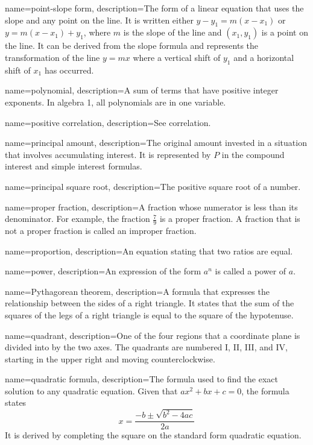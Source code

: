  {
	name=point-slope form,
	description={The form of a linear equation that uses the slope and any point on the line. It is written either $y-y_1 = m(x-x_1)$ or $y=m(x-x_1)+y_1$, where $m$ is the slope of the line and $(x_1,y_1)$ is a point on the line. It can be derived from the slope formula and represents the transformation of the line $y = mx$ where a vertical shift of $y_1$ and a horizontal shift of $x_1$ has occurred.}
}

 {
	name=polynomial,
	description={A sum of terms that have positive integer exponents. In algebra 1, all polynomials are in one variable.}
}

 {
	name=positive correlation,
	description={See \gls{correlation}.}
}

 {
	name=principal amount,
	description={The original amount invested in a situation that involves accumulating interest. It is represented by $P$ in the \gls{compound interest} and simple interest formulas.}
}

 {
	name=principal square root,
	description={The positive square root of a number.}
}

 {
	name=proper fraction,
	description={A fraction whose \gls{numerator} is less than its \gls{denominator}. For example, the fraction $\frac{7}{9}$ is a proper fraction. A fraction that is not a proper fraction is called an \gls{improper fraction}.}
}

 {
	name=proportion,
	description={An equation stating that two ratios are equal.}
}

 {
	name=power,
	description={An expression of the form $a^n$ is called a power of $a$.}
}
 
 {
	name=Pythagorean theorem,
	description={A formula that expresses the relationship between the sides of a right triangle. It states that the sum of the squares of the legs of a right triangle is equal to the square of the \gls{hypotenuse}.}
}

 {
	name=quadrant,
	description={One of the four regions that a coordinate plane is divided into by the two axes. The quadrants are numbered I, II, III, and IV, starting in the upper right and moving counterclockwise.}
}

 {
	name=quadratic formula,
	description={The formula used to find the exact solution to any quadratic equation. Given that $ax^2+bx+c=0$, the formula states \[x = \frac{-b \pm \sqrt{b^2 - 4ac}}{2a}\] It is derived by completing the square on the standard form quadratic equation.}
}

